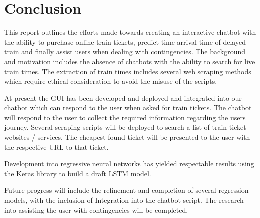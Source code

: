 \section{Conclusion}

This report outlines the efforts made towards creating an interactive chatbot with the ability to purchase online train tickets, predict time arrival time of delayed train and finally assist users when dealing with contingencies. The background and motivation includes the absence of chatbots with the ability to search for live train times. The extraction of train times includes several web scraping methods which require ethical consideration to avoid the misuse of the scripts.\vspace{0.5cm}

\noindent
At present the GUI has been developed and deployed and integrated into our chatbot which can respond to the user when asked for train tickets. The chatbot will respond to the user to collect the required information regarding the users journey. Several scraping scripts will be deployed to search a list of train ticket websites / services. The cheapest found ticket will be presented to the user with the respective URL to that ticket.\vspace{0.5cm}

\noindent
Development into regressive neural networks has yielded respectable results using the Keras library to build a draft LSTM model.\vspace{0.5cm}

\noindent
Future progress will include the refinement and completion of several regression models, with the inclusion of Integration into the chatbot script. The research into assisting the user with contingencies will be completed.